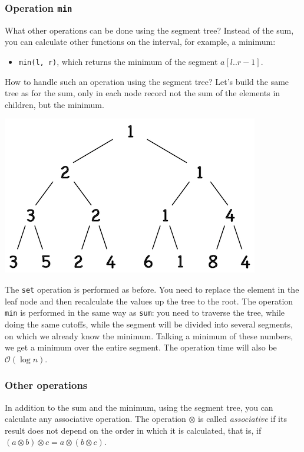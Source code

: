 \documentclass[11pt]{article}
\begin{document}
\subsubsection{Operation \texttt{min}}
\label{sec:orgb50bb00}
What other operations can be done using the segment tree? Instead of the sum, you can calculate
other functions on the interval, for example, a minimum:
\begin{itemize}
\item \texttt{min(l, r)}, which returns the minimum of the segment \(a[l..r - 1]\).
\end{itemize}

How to handle such an operation using the segment tree? Let's build the same tree as for the
sum, only in each node record not the sum of the elements in children, but the minimum.
\begin{center}
\includegraphics[width=.9\linewidth]{./images/segment-tree-6.png}
\end{center}

The \texttt{set} operation is performed as before. You need to replace the element in the leaf node and
then recalculate the values up the tree to the root. The operation \texttt{min} is performed in the
same way as \texttt{sum}: you need to traverse the tree, while doing the same cutoffs, while the
segment will be divided into several segments, on which we already know the minimum. Talking a
minimum of these numbers, we get a minimum over the entire segment. The operation time will also
be \(\mathcal{O}(\log n)\).

\subsubsection{Other operations}
\label{sec:orgb167519}
In addition to the sum and the minimum, using the segment tree, you can calculate any
associative operation. The operation \(\otimes\) is called \emph{associative} if its result does not
depend on the order in which it is calculated, that is, if \((a \otimes b) \otimes c = a \otimes
    (b \otimes c)\).
\end{document}
